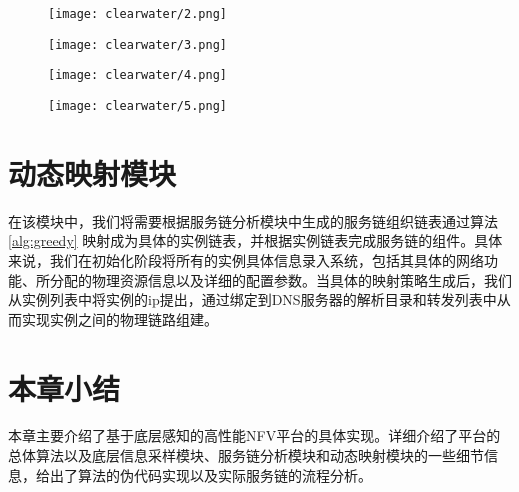 \begin{figure}[!htp]
	\centering
	\texttt{[image: clearwater/2.png]}
\end{figure}

\begin{figure}[!htp]
	\ContinuedFloat
	\centering
	\texttt{[image: clearwater/3.png]}
\end{figure}

\begin{figure}[!htp]
	\centering
	\label{fig:flow_inDialog}
	\texttt{[image: clearwater/4.png]}
\end{figure}

\begin{figure}[!htp]
	\centering
	\label{fig:flow_terminate}
	\texttt{[image: clearwater/5.png]}
\end{figure}




\section{动态映射模块}
在该模块中，我们将需要根据服务链分析模块中生成的服务链组织链表通过算法 \ref{alg:greedy} 映射成为具体的实例链表，并根据实例链表完成服务链的组件。具体来说，我们在初始化阶段将所有的实例具体信息录入系统，包括其具体的网络功能、所分配的物理资源信息以及详细的配置参数。当具体的映射策略生成后，我们从实例列表中将实例的ip提出，通过绑定到DNS服务器的解析目录和转发列表中从而实现实例之间的物理链路组建。

\section{本章小结}
本章主要介绍了基于底层感知的高性能NFV平台的具体实现。详细介绍了平台的总体算法以及底层信息采样模块、服务链分析模块和动态映射模块的一些细节信息，给出了算法的伪代码实现以及实际服务链的流程分析。
